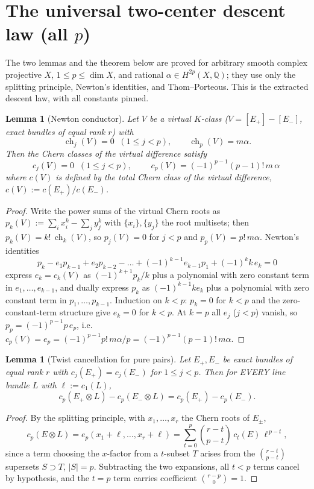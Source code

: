 \documentclass[11pt]{article}
\newtheorem{lemma}[theorem]{Lemma}
\theoremstyle{definition}
\newcommand{\ch}{\operatorname{ch}}
\newcommand{\tensor}{\otimes}
\begin{document}
\section{The universal two-center descent law (all $p$)}

The two lemmas and the theorem below are proved for arbitrary smooth
complex projective $X$, $1\le p\le\dim X$, and rational
$\alpha\in H^{2p}(X,\mathbb Q)$; they use only the splitting
principle, Newton's identities, and Thom--Porteous. This is the
extracted descent law, with all constants pinned.

\begin{lemma}[Newton conductor]
\label{lem:newton}
Let $V$ be a virtual $K$-class ($V=[E_+]-[E_-]$, exact bundles of
equal rank $r$) with
\[
\ch_j(V)=0\;\;(1\le j<p),\qquad \ch_p(V)=m\alpha .
\]
Then the Chern classes of the virtual difference satisfy
\[
c_j(V)=0\;\;(1\le j<p),\qquad
\boxed{\;c_p(V)=(-1)^{p-1}(p-1)!\,m\,\alpha\;}
\]
where $c(V)$ is defined by the total Chern class of the virtual
difference, $c(V):=c(E_+)/c(E_-)$.
\end{lemma}

\begin{proof}
Write the power sums of the virtual Chern roots as
$p_k(V):=\sum_i x_i^k-\sum_j y_j^k$ with $\{x_i\},\{y_j\}$ the root
multisets; then $p_k(V)=k!\,\ch_k(V)$, so $p_j(V)=0$ for $j<p$ and
$p_p(V)=p!\,m\alpha$. Newton's identities
\[
p_k-e_1p_{k-1}+e_2p_{k-2}-\dots+(-1)^{k-1}e_{k-1}p_1
+(-1)^k k\,e_k=0
\]
express $e_k=c_k(V)$ as $(-1)^{k+1}p_k/k$ plus a polynomial with zero
constant term in $e_1,\dots,e_{k-1}$, and dually express $p_k$ as
$(-1)^{k-1}ke_k$ plus a polynomial with zero constant term in
$p_1,\dots,p_{k-1}$. Induction on $k<p$: $p_k=0$ for $k<p$ and the
zero-constant-term structure give $e_k=0$ for $k<p$. At $k=p$ all
$e_j$ ($j<p$) vanish, so $p_p=(-1)^{p-1}p\,e_p$, i.e.\
$c_p(V)=e_p=(-1)^{p-1}p!\,m\alpha/p=(-1)^{p-1}(p-1)!\,m\alpha$.
\end{proof}

\begin{lemma}[Twist cancellation for pure pairs]
\label{lem:twist}
Let $E_+,E_-$ be exact bundles of equal rank $r$ with
$c_j(E_+)=c_j(E_-)$ for $1\le j<p$. Then for EVERY line bundle $L$
with $\ell:=c_1(L)$,
\[
c_p(E_+\tensor L)-c_p(E_-\tensor L)=c_p(E_+)-c_p(E_-).
\]
\end{lemma}

\begin{proof}
By the splitting principle, with $x_1,\dots,x_r$ the Chern roots of
$E_\pm$,
\[
c_p(E\tensor L)=e_p(x_1+\ell,\dots,x_r+\ell)
=\sum_{t=0}^{p}\binom{r-t}{p-t}\,c_t(E)\,\ell^{\,p-t},
\]
since a term choosing the $x$-factor from a $t$-subset $T$ arises from
the $\binom{r-t}{p-t}$ supersets $S\supset T$, $|S|=p$. Subtracting
the two expansions, all $t<p$ terms cancel by hypothesis, and the
$t=p$ term carries coefficient $\binom{r-p}{0}=1$.
\end{proof}
\end{document}

